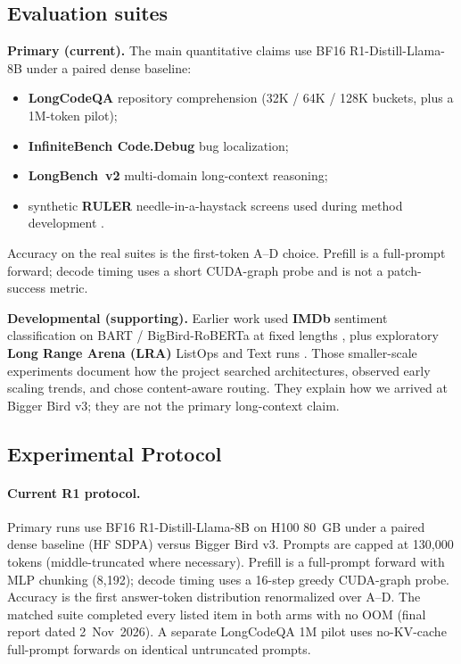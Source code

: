 \documentclass[11pt]{article}
\begin{document}
\subsection{Evaluation suites}

\textbf{Primary (current).} The main quantitative claims use BF16
R1-Distill-Llama-8B under a paired dense baseline:
\begin{itemize}
  \item \textbf{LongCodeQA} repository comprehension (32K / 64K / 128K
    buckets, plus a 1M-token pilot);
  \item \textbf{InfiniteBench Code.Debug} bug localization;
  \item \textbf{LongBench~v2} multi-domain long-context reasoning;
  \item synthetic \textbf{RULER} needle-in-a-haystack screens used during
    method development \citep{hsieh2024ruler}.
\end{itemize}
Accuracy on the real suites is the first-token A--D choice. Prefill is a
full-prompt forward; decode timing uses a short CUDA-graph probe and is not a
patch-success metric.

\textbf{Developmental (supporting).} Earlier work used \textbf{IMDb}
sentiment classification on BART / BigBird-RoBERTa at fixed lengths
\citep{maas2011imdb}, plus exploratory \textbf{Long Range Arena (LRA)}
ListOps and Text runs \citep{tay2021lra}. Those smaller-scale experiments
document how the project searched architectures, observed early scaling
trends, and chose content-aware routing. They explain how we arrived at
Bigger Bird v3; they are not the primary long-context claim.

\subsection{Experimental Protocol}
\label{sec:protocol}

\paragraph{Current R1 protocol.}
Primary runs use BF16 R1-Distill-Llama-8B on H100 80~GB under a paired dense
baseline (HF SDPA) versus Bigger Bird v3. Prompts are capped at 130{,}000
tokens (middle-truncated where necessary). Prefill is a full-prompt forward
with MLP chunking (8{,}192); decode timing uses a 16-step greedy CUDA-graph
probe. Accuracy is the first answer-token distribution renormalized over
A--D. The matched suite completed every listed item in both arms with no OOM
(final report dated 2~Nov~2026). A separate LongCodeQA 1M pilot uses
no-KV-cache full-prompt forwards on identical untruncated prompts.
\end{document}
